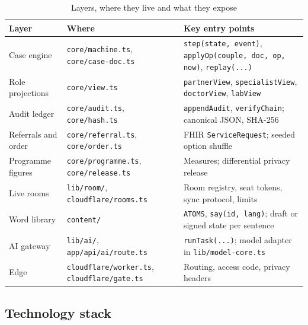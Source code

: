 \documentclass[10.5pt,a4paper]{article}
\newcommand{\thead}[1]{\textbf{#1}}
\newcommand{\toprl}{\arrayrulecolor{ink}\toprule\arrayrulecolor{rule}}
\newcommand{\code}[1]{\texttt{\small #1}}
\newcommand{\file}[1]{\leavevmode\textcolor{muted}{\texttt{\small #1}}}
\begin{document}
{\small
\begin{xltabular}{\textwidth}{@{}P{2.8cm}P{4.2cm}L@{}}
\caption{Layers, where they live and what they expose}\\
\toprl
\thead{Layer} & \thead{Where} & \thead{Key entry points}\\
\midrule
Case engine & \file{core/machine.ts}, \file{core/case-doc.ts} & \code{step(state, event)}, \code{applyOp(couple, doc, op, now)}, \code{replay(...)}\\
\midrule
Role projections & \file{core/view.ts} & \code{partnerView}, \code{specialistView}, \code{doctorView}, \code{labView}\\
\midrule
Audit ledger & \file{core/audit.ts}, \file{core/hash.ts} & \code{appendAudit}, \code{verifyChain}; canonical JSON, SHA-256\\
\midrule
Referrals and order & \file{core/referral.ts}, \file{core/order.ts} & FHIR \code{ServiceRequest}; seeded option shuffle\\
\midrule
Programme figures & \file{core/programme.ts}, \file{core/release.ts} & Measures; differential privacy release\\
\midrule
Live rooms & \file{lib/room/}, \file{cloudflare/rooms.ts} & Room registry, seat tokens, sync protocol, limits\\
\midrule
Word library & \file{content/} & \code{ATOMS}, \code{say(id, lang)}; draft or signed state per sentence\\
\midrule
AI gateway & \file{lib/ai/}, \file{app/api/ai/route.ts} & \code{runTask(...)}; model adapter in \file{lib/model-core.ts}\\
\midrule
Edge & \file{cloudflare/worker.ts}, \file{cloudflare/gate.ts} & Routing, access code, privacy headers\\
\bottomrule
\end{xltabular}}


\subsection{Technology stack}
\end{document}
